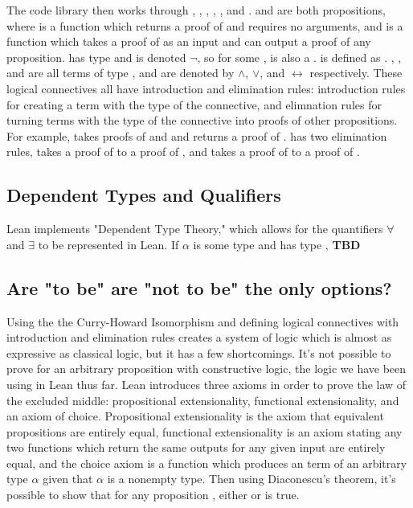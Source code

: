 The code library then works through , , , 
, , and .
 and  are both propositions, where  is a function which
returns a proof of  and requires no arguments, and  is a function
which takes a proof of  as an input and can output a proof of any
proposition.  has type  and is denoted $\lnot$, so for
some ,  is also a .  is defined as
. , , and  are all terms of type 
, and are denoted by 
$\wedge$, $\vee$, and $\leftrightarrow$ respectively. These logical connectives
all have introduction and elimination rules: introduction rules for
creating a term with the type of the connective, and elimnation rules for
turning terms with the type of the connective into proofs of other propositions.
For example,  takes proofs of  and  and returns a proof of
.  has two elimination rules,  takes a proof
of  to a proof of , and  takes a proof of 
 to a proof of . 

\subsection{Dependent Types and Qualifiers}

Lean implements "Dependent Type Theory," which allows for the quantifiers
$\forall$ and $\exists$ to be represented in Lean. If $\alpha$ is some
type and  has type , \textbf{TBD}

\subsection{Are "to be" are "not to be" the only options?}

Using the the Curry-Howard Isomorphism and defining logical connectives
with introduction and elimination rules creates a system of logic which
is almost as expressive as classical logic, but it has a few shortcomings.
It's not possible to prove  for an arbitrary proposition 
with constructive logic, the logic we have been using in Lean thus far.
Lean introduces three axioms in order to prove the law of the
excluded middle: propositional extensionality, functional
extensionality, and an axiom of choice. Propositional extensionality is the
axiom that equivalent propositions are entirely equal, functional extensionality
is an axiom stating any two functions which return the same outputs for any
given input are entirely equal, and the choice axiom is a function which produces
an term of an arbitrary type $\alpha$ given that $\alpha$ is a nonempty
type. Then using Diaconescu's theorem, it's possible to show that for any
proposition , either  or  is true. 

